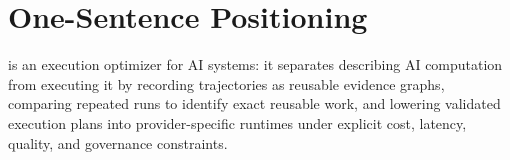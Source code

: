 \section{One-Sentence Positioning}

\migaki{} is an execution optimizer for AI systems: it separates describing AI computation from executing it by recording trajectories as reusable evidence graphs, comparing repeated runs to identify exact reusable work, and lowering validated execution plans into provider-specific runtimes under explicit cost, latency, quality, and governance constraints.
